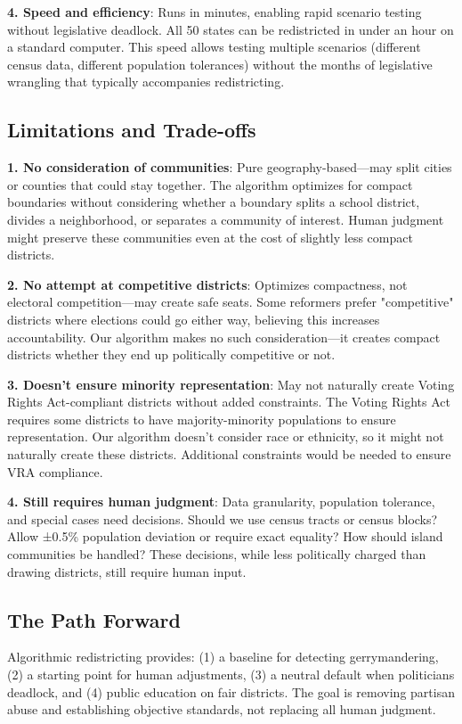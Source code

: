 \documentclass[11pt]{article}
\begin{document}
\textbf{4. Speed and efficiency}: Runs in minutes, enabling rapid scenario testing without legislative deadlock. All 50 states can be redistricted in under an hour on a standard computer. This speed allows testing multiple scenarios (different census data, different population tolerances) without the months of legislative wrangling that typically accompanies redistricting.

\subsection{Limitations and Trade-offs}

\textbf{1. No consideration of communities}: Pure geography-based—may split cities or counties that could stay together. The algorithm optimizes for compact boundaries without considering whether a boundary splits a school district, divides a neighborhood, or separates a community of interest. Human judgment might preserve these communities even at the cost of slightly less compact districts.

\textbf{2. No attempt at competitive districts}: Optimizes compactness, not electoral competition—may create safe seats. Some reformers prefer "competitive" districts where elections could go either way, believing this increases accountability. Our algorithm makes no such consideration—it creates compact districts whether they end up politically competitive or not.

\textbf{3. Doesn't ensure minority representation}: May not naturally create Voting Rights Act-compliant districts without added constraints. The Voting Rights Act requires some districts to have majority-minority populations to ensure representation. Our algorithm doesn't consider race or ethnicity, so it might not naturally create these districts. Additional constraints would be needed to ensure VRA compliance.

\textbf{4. Still requires human judgment}: Data granularity, population tolerance, and special cases need decisions. Should we use census tracts or census blocks? Allow ±0.5\% population deviation or require exact equality? How should island communities be handled? These decisions, while less politically charged than drawing districts, still require human input.

\subsection{The Path Forward}

Algorithmic redistricting provides: (1) a baseline for detecting gerrymandering, (2) a starting point for human adjustments, (3) a neutral default when politicians deadlock, and (4) public education on fair districts. The goal is removing partisan abuse and establishing objective standards, not replacing all human judgment.
\end{document}
